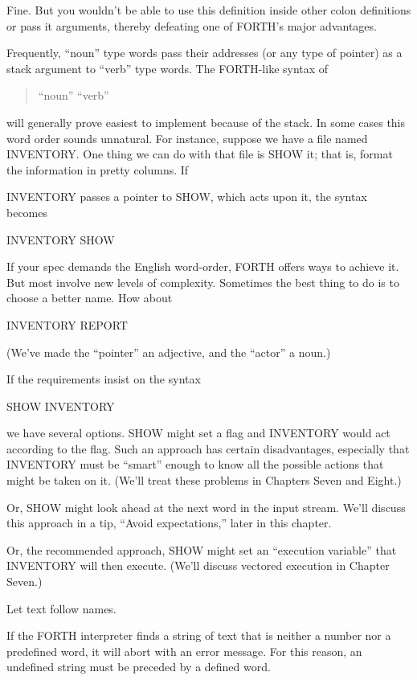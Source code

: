 Fine. But you wouldn't be able to use this definition inside other
colon definitions or pass it arguments, thereby defeating one of FORTH's
major advantages.

Frequently, ``noun'' type words pass their addresses (or any type of
pointer) as a stack argument to ``verb'' type words. The FORTH-like syntax of
\begin{quote}
{\sf ``noun'' ``verb''}
\end{quote}
will generally prove easiest to implement because of the stack.
In some cases this word order sounds unnatural. For instance, suppose
we have a file named INVENTORY. One thing we can do with that
file is SHOW it; that is, format the information in pretty columns. If

INVENTORY passes a pointer to SHOW, which acts upon it, the syntax
becomes
\begin{Code}
INVENTORY SHOW
\end{Code}
If your spec demands the English word-order, FORTH offers ways to
achieve it. But most involve new levels of complexity. Sometimes the
best thing to do is to choose a better name. How about
\begin{Code}
INVENTORY REPORT
\end{Code}
(We've made the ``pointer'' an adjective, and the ``actor'' a noun.)

If the requirements insist on the syntax
\begin{Code}
SHOW INVENTORY
\end{Code}
we have several options. SHOW might set a flag and INVENTORY
would act according to the flag. Such an approach has certain disadvantages,
especially that INVENTORY must be ``smart'' enough to
know all the possible actions that might be taken on it. (We'll treat these
problems in Chapters Seven and Eight.)

Or, SHOW might look ahead at the next word in the input stream.
We'll discuss this approach in a tip, ``Avoid expectations,'' later in this
chapter.

Or, the recommended approach, SHOW might set an ``execution
variable'' that INVENTORY will then execute. (We'll discuss vectored
execution in Chapter Seven.)
\begin{tip}
Let text follow names.
\end{tip}
If the FORTH interpreter finds a string of text that is neither a number
nor a predefined word, it will abort with an error message. For this
reason, an undefined string must be preceded by a defined word.

